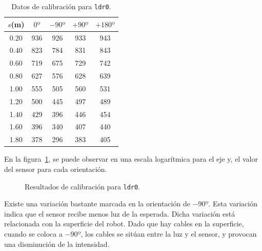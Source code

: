 \documentclass[10pt,a4paper,hidelinks,twocolumn,nobalancelastpage]{article}
\begin{document}
\begin{table}[h]
\centering
\begin{tabular}{ | c | c | c | c | c | }
\hline
$s$(m) & $0º$ & $-90º$ & $+90º$ & $+180º$ \\ \hline
0.20 & 936 & 926 & 933 & 943 \\ \hline
0.40 & 823 & 784 & 831 & 843 \\ \hline
0.60 & 719 & 675 & 729 & 742 \\ \hline
0.80 & 627 & 576 & 628 & 639 \\ \hline
1.00 & 555 & 505 & 560 & 531 \\ \hline
1.20 & 500 & 445 & 497 & 489 \\ \hline
1.40 & 429 & 396 & 446 & 454 \\ \hline
1.60 & 396 & 340 & 407 & 440 \\ \hline
1.80 & 378 & 296 & 383 & 405 \\ \hline
\end{tabular}
\caption{Datos de calibración para \texttt{ldr0}.\label{tab:ldr0}}
\end{table}

En la figura~\ref{fig:ldr0}, se puede observar en una escala logarítmica para el 
eje y, el valor del sensor para cada orientación.

\begin{figure}[h]
\centering
{}
\caption{Resultados de calibración para \texttt{ldr0}.\label{fig:ldr0}}
\end{figure}

Existe una variación bastante marcada en la orientación de $-90º$. Esta 
variación indica que el sensor recibe menos luz de la esperada. Dicha variación 
está relacionada con la superficie del robot. Dado que hay cables en la 
superficie, cuando se coloca a $-90º$, los cables se sitúan entre la luz y el 
sensor, y provocan una disminución de la intensidad.
\end{document}
